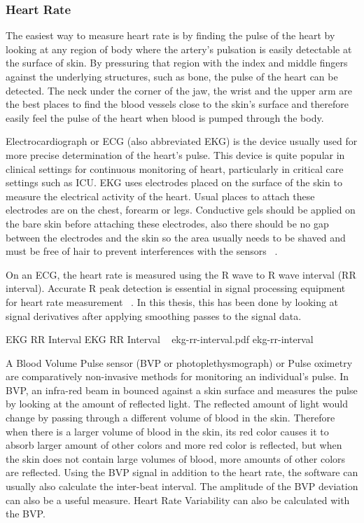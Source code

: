 \subsubsection{Heart Rate}
The easiest way to measure heart rate is by finding the pulse of the heart by looking at any region of body where the artery's pulsation is easily detectable at the surface of skin. By pressuring that region with the index and middle fingers against the underlying structures, such as bone, the pulse of the heart can be detected. The neck under the corner of the jaw, the wrist and the upper arm are the best places to find the blood vessels close to the skin's surface and therefore easily feel the pulse of the heart when blood is pumped through the body. %

Electrocardiograph or ECG (also abbreviated EKG) is the device usually used for more precise determination of the heart's pulse. This device is quite popular in clinical settings for continuous monitoring of heart, particularly in critical care settings such as ICU. EKG uses electrodes placed on the surface of the skin to measure the electrical activity of the heart. Usual places to attach these electrodes are on the chest, forearm or legs. Conductive gels should be applied on the bare skin before attaching these electrodes, also there should be no gap between the electrodes and the skin so the area usually needs to be shaved and must be free of hair to prevent interferences with the sensors ~\cite{stern2001psychophysiological}.

On an ECG, the heart rate is measured using the R wave to R wave interval (RR interval). Accurate R peak detection is essential in signal processing equipment for heart rate measurement ~\cite{pise2011thinkquest}. In this thesis, this has been done by looking at signal derivatives after applying smoothing passes to the signal data.

\img
{EKG RR Interval}
{EKG RR Interval ~\cite{wiki2014bvp}}
{ekg-rr-interval.pdf}
{ekg-rr-interval}

A Blood Volume Pulse sensor (BVP or photoplethysmograph) or Pulse oximetry are  comparatively non-invasive methods for monitoring an individual's pulse. In BVP, an infra-red beam in bounced against a skin surface and measures the pulse by looking at the amount of reflected light. The reflected amount of light would change by passing through a different volume of blood in the skin. Therefore when there is a larger volume of blood in the skin, its red color causes it to absorb larger amount of other colors and more red color is reflected, but when the skin does not contain large volumes of blood, more amounts of other colors are reflected. %
Using the BVP signal in addition to the heart rate, the software can usually also calculate the inter-beat interval. The amplitude of the BVP deviation can also be a useful measure. Heart Rate Variability can also be calculated with the BVP.

